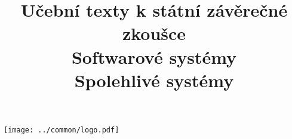 \clearpage

\clearpage

\title{\LARGE Učební texty k státní závěrečné zkoušce \\ Softwarové systémy \\ Spolehlivé systémy}




\maketitle

\vspace{10mm}
\begin{center}
\texttt{[image: ../common/logo.pdf]}
\end{center} 

\clearpage

\clearpage

\tableofcontents







